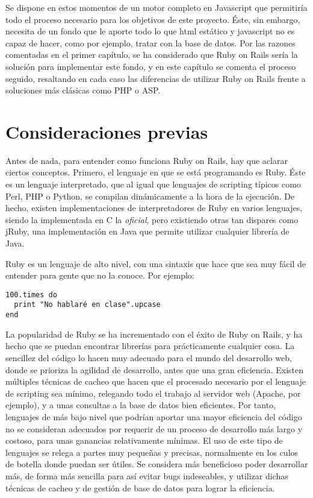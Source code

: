 Se dispone en estos momentos de un motor completo en Javascript que permitiría todo el proceso necesario para los objetivos de este proyecto. Éste, sin embargo, necesita de un fondo que le aporte todo lo que html estático y javascript no es capaz de hacer, como por ejemplo, tratar con la base de datos. Por las razones comentadas en el primer capítulo, se ha considerado que Ruby on Rails sería la solución para implementar este fondo, y en este capítulo se comenta el proceso seguido, resaltando en cada caso las diferencias de utilizar Ruby on Rails frente a soluciones más clásicas como PHP o ASP.

\section{Consideraciones previas} %
\label{sec:ruby_on_rails_consideraciones_previas}
Antes de nada, para entender como funciona Ruby on Rails, hay que aclarar ciertos conceptos. Primero, el lenguaje en que se está programando es Ruby. Éste es un lenguaje interpretado, que al igual que lenguajes de scripting típicos como Perl, PHP o Python, se compilan dinámicamente a la hora de la ejecución. De hecho, existen implementaciones de interpretadores de Ruby en varios lenguajes, siendo la implementada en C la \emph{oficial}, pero existiendo otras tan dispares como jRuby, una implementación en Java que permite utilizar cualquier librería de Java.

Ruby es un lenguaje de alto nivel, con una sintaxis que hace que sea muy fácil de entender para gente que no la conoce. Por ejemplo:

\begin{verbatim}
100.times do 
  print "No hablaré en clase".upcase
end  
\end{verbatim}

La popularidad de Ruby se ha incrementado con el éxito de Ruby on Rails, y ha hecho que se puedan encontrar librerías para prácticamente cualquier cosa. La sencillez del código lo hacen muy adecuado para el mundo del desarrollo web, donde se prioriza la agilidad de desarrollo, antes que una gran eficiencia. Existen múltiples técnicas de cacheo que hacen que el procesado necesario por el lenguaje de scripting sea mínimo, relegando todo el trabajo al servidor web (Apache, por ejemplo), y a unas consultas a la base de datos bien eficientes. Por tanto, lenguajes de más bajo nivel que podrían aportar una mayor eficiencia del código no se consideran adecuados por requerir de un proceso de desarrollo más largo y costoso, para unas ganancias relativamente mínimas. El uso de este tipo de lenguajes se relega a partes muy pequeñas y precisas, normalmente en los culos de botella donde puedan ser útiles. Se considera más beneficioso poder desarrollar más, de forma más sencilla para así evitar bugs indeseables, y utilizar dichas técnicas de cacheo y de gestión de base de datos para lograr la eficiencia.

